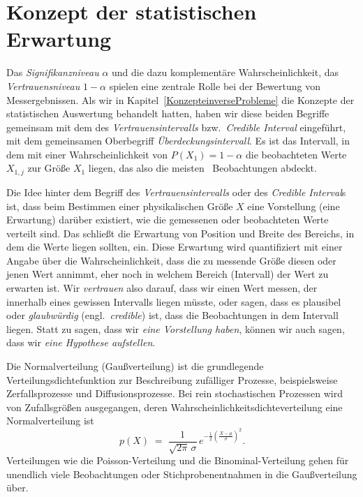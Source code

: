 
\section{Konzept der statistischen Erwartung}

Das \textsl{Signifikanzniveau} $\alpha$ und die dazu komplementäre Wahrscheinlichkeit,
das \textsl{Vertrauensniveau} $1 - \alpha$ spielen eine zentrale Rolle bei der Bewertung
von Messergebnissen. Als wir in Kapitel~\ref{KonzepteinverseProbleme} die Konzepte der statistischen Auswertung
behandelt hatten,
haben wir diese beiden Begriffe gemeinsam mit dem des \textsl{Vertrauensintervalls} bzw.\
\textsl{Credible Interval} eingeführt, mit dem gemeinsamen Oberbegriff \textsl{Überdeckungsintervall}.
Es ist das Intervall, in dem mit einer Wahrscheinlichkeit von $P(X_1) = 1 - \alpha$ die
beobachteten Werte $X_{1,j}$ zur Größe $X_1$ liegen, das also die \glqq meisten\grqq
~Beobachtungen abdeckt.

Die Idee hinter dem Begriff des \textsl{Vertrauensintervalls} oder des \textsl{Credible Interval}s
ist, dass beim Bestimmen einer physikalischen Größe $X$ eine Vorstellung (eine Erwartung) darüber
existiert, wie die gemessenen oder beobachteten Werte verteilt sind. Das schließt die
Erwartung von Position und Breite des Bereichs, in dem die Werte liegen sollten, ein.
Diese Erwartung wird quantifiziert mit einer Angabe über die Wahrscheinlichkeit, dass die
zu messende Größe diesen oder jenen Wert annimmt, eher noch in welchem Bereich (Intervall) der
Wert zu erwarten ist. Wir \textsl{vertrauen} also darauf, dass wir einen Wert messen, der innerhalb eines
gewissen Intervalls liegen müsste, oder sagen, dass es plausibel oder \textsl{glaubwürdig}
(engl.\ \textsl{credible}) ist, dass die Beobachtungen in dem Intervall liegen.
Statt zu sagen, dass wir \textsl{eine Vorstellung haben}, können wir auch sagen,
dass wir \textsl{eine Hypothese aufstellen}. 

Die Normalverteilung (Gaußverteilung) ist die grundlegende Verteilungsdichtefunktion
zur Beschreibung zufälliger Prozesse, beispielsweise Zerfallsprozesse und Diffusionsprozesse.
Bei rein stochastischen Prozessen wird von Zufallsgrößen ausgegangen, deren
Wahrscheinlichkeitsdichteverteilung eine Normalverteilung ist
\begin{equation}
p(X) \; = \; \frac{1}{\sqrt{2 \pi} \, \sigma} \, e^{-\frac{1}{2}\left(\frac{X - \mu}{\sigma}\right)^2}.
\end{equation}
Verteilungen wie die Poisson-Verteilung und die Binominal-Verteilung gehen für
unendlich viele Beobachtungen oder Stichprobenentnahmen in die Gaußverteilung über.

